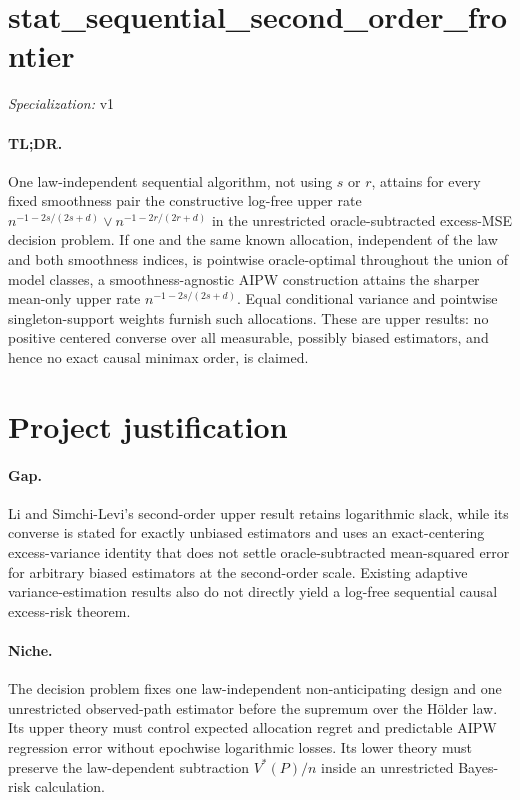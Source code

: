 \documentclass{article}
\begin{document}
\sloppy

\section*{stat\_\allowbreak{}sequential\_\allowbreak{}second\_\allowbreak{}order\_\allowbreak{}frontier}

\noindent\textit{Specialization:} v1\par

\paragraph{TL;DR.} One law-independent sequential algorithm, not using \(s\) or \(r\), attains for every fixed smoothness pair the constructive log-free upper rate \(n^{-1-2s/(2s+d)}\vee n^{-1-2r/(2r+d)}\) in the unrestricted oracle-subtracted excess-MSE decision problem. If one and the same known allocation, independent of the law and both smoothness indices, is pointwise oracle-optimal throughout the union of model classes, a smoothness-agnostic AIPW construction attains the sharper mean-only upper rate \(n^{-1-2s/(2s+d)}\). Equal conditional variance and pointwise singleton-support weights furnish such allocations. These are upper results: no positive centered converse over all measurable, possibly biased estimators, and hence no exact causal minimax order, is claimed.

\section{Project justification}

\paragraph{Gap.} Li and Simchi-Levi's second-order upper result retains logarithmic slack, while its converse is stated for exactly unbiased estimators and uses an exact-centering excess-variance identity that does not settle oracle-subtracted mean-squared error for arbitrary biased estimators at the second-order scale. Existing adaptive variance-estimation results also do not directly yield a log-free sequential causal excess-risk theorem.

\paragraph{Niche.} The decision problem fixes one law-independent non-anticipating design and one unrestricted observed-path estimator before the supremum over the Hölder law. Its upper theory must control expected allocation regret and predictable AIPW regression error without epochwise logarithmic losses. Its lower theory must preserve the law-dependent subtraction \(V^*(P)/n\) inside an unrestricted Bayes-risk calculation.
\end{document}
